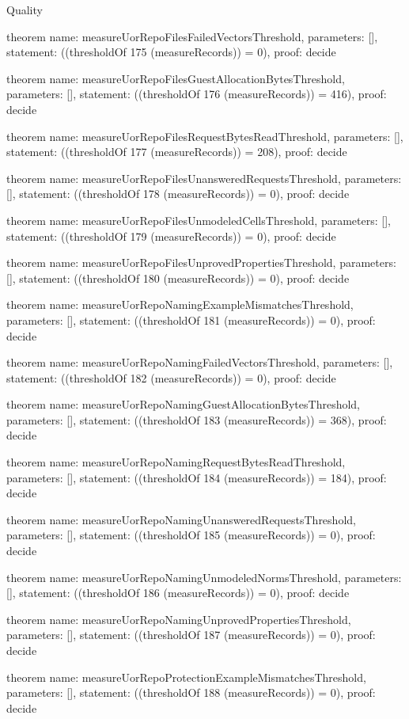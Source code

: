 \begin{lexlean}{Quality}
\begin{semanticmodule}
theorem{
  name: measureUorRepoFilesFailedVectorsThreshold,
  parameters: [],
  statement: ((thresholdOf 175 (measureRecords)) = 0),
  proof: decide{}
}

theorem{
  name: measureUorRepoFilesGuestAllocationBytesThreshold,
  parameters: [],
  statement: ((thresholdOf 176 (measureRecords)) = 416),
  proof: decide{}
}

theorem{
  name: measureUorRepoFilesRequestBytesReadThreshold,
  parameters: [],
  statement: ((thresholdOf 177 (measureRecords)) = 208),
  proof: decide{}
}

theorem{
  name: measureUorRepoFilesUnansweredRequestsThreshold,
  parameters: [],
  statement: ((thresholdOf 178 (measureRecords)) = 0),
  proof: decide{}
}

theorem{
  name: measureUorRepoFilesUnmodeledCellsThreshold,
  parameters: [],
  statement: ((thresholdOf 179 (measureRecords)) = 0),
  proof: decide{}
}

theorem{
  name: measureUorRepoFilesUnprovedPropertiesThreshold,
  parameters: [],
  statement: ((thresholdOf 180 (measureRecords)) = 0),
  proof: decide{}
}

theorem{
  name: measureUorRepoNamingExampleMismatchesThreshold,
  parameters: [],
  statement: ((thresholdOf 181 (measureRecords)) = 0),
  proof: decide{}
}

theorem{
  name: measureUorRepoNamingFailedVectorsThreshold,
  parameters: [],
  statement: ((thresholdOf 182 (measureRecords)) = 0),
  proof: decide{}
}

theorem{
  name: measureUorRepoNamingGuestAllocationBytesThreshold,
  parameters: [],
  statement: ((thresholdOf 183 (measureRecords)) = 368),
  proof: decide{}
}

theorem{
  name: measureUorRepoNamingRequestBytesReadThreshold,
  parameters: [],
  statement: ((thresholdOf 184 (measureRecords)) = 184),
  proof: decide{}
}

theorem{
  name: measureUorRepoNamingUnansweredRequestsThreshold,
  parameters: [],
  statement: ((thresholdOf 185 (measureRecords)) = 0),
  proof: decide{}
}

theorem{
  name: measureUorRepoNamingUnmodeledNormsThreshold,
  parameters: [],
  statement: ((thresholdOf 186 (measureRecords)) = 0),
  proof: decide{}
}

theorem{
  name: measureUorRepoNamingUnprovedPropertiesThreshold,
  parameters: [],
  statement: ((thresholdOf 187 (measureRecords)) = 0),
  proof: decide{}
}

theorem{
  name: measureUorRepoProtectionExampleMismatchesThreshold,
  parameters: [],
  statement: ((thresholdOf 188 (measureRecords)) = 0),
  proof: decide{}
}


\end{semanticmodule}
\end{lexlean}
